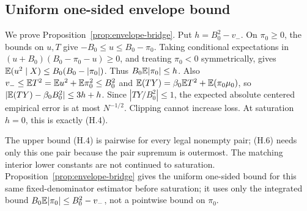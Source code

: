 \subsection{Uniform one-sided envelope bound}
\label{app:envelope-proof}
We prove Proposition~\ref{prop:envelope-bridge}. Put \(h=B_0^2-v_-\).
On \(\pi_0\ge0\), the bounds on \(u,T\) give \(-B_0\le u\le B_0-\pi_0\).
Taking conditional expectations in
\((u+B_0)(B_0-\pi_0-u)\ge0\), and treating \(\pi_0<0\) symmetrically, gives
\(\mathbb E(u^2\mid X)\le B_0(B_0-|\pi_0|)\). Thus \(B_0\mathbb E|\pi_0|\le h\).
Also \(v_-\le\mathbb E T^2=\mathbb E u^2+\mathbb E\pi_0^2\le B_0^2\) and
\(\mathbb E(TY)=\beta_0\mathbb E T^2+\mathbb E(\pi_0\mu_0)\), so
\(|\mathbb E(TY)-\beta_0B_0^2|\le3h+h\).
Since \(|TY/B_0^2|\le1\), the expected absolute centered empirical error
is at most \(N^{-1/2}\). Clipping cannot increase loss. At saturation
\(h=0\), this is exactly (H.4).

The upper bound (H.4) is pairwise for every legal nonempty pair; (H.6) needs
only this one pair because the pair supremum is outermost.  The matching interior lower constants are not continued to saturation. Proposition~\ref{prop:envelope-bridge} gives the uniform one-sided bound for this same fixed-denominator estimator before saturation; it uses only the integrated bound \(B_0\mathbb E|\pi_0|\le B_0^2-v_-\), not a pointwise bound on \(\pi_0\).
